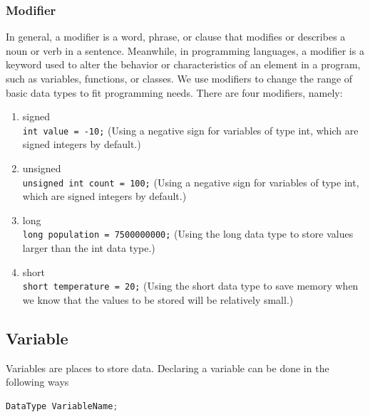 \subsubsection{Modifier}
In general, a modifier is a word, phrase, or clause that modifies or describes a noun or verb in a sentence. Meanwhile, in programming languages, a modifier is a keyword used to alter the behavior or characteristics of an element in a program, such as variables, functions, or classes. We use modifiers to change the range of basic data types to fit programming needs. There are four modifiers, namely:
\begin{enumerate}
	\item signed \\
	      \verb|int value = -10;| (Using a negative sign for variables of type int, which are signed integers by default.)
	\item unsigned \\
	      \verb|unsigned int count = 100;|  (Using a negative sign for variables of type int, which are signed integers by default.)
	\item long \\
	      \verb|long population = 7500000000;| (Using the long data type to store values larger than the int data type.)
	\item short \\
	      \verb|short temperature = 20;| (Using the short data type to save memory when we know that the values to be stored will be relatively small.)
\end{enumerate}


\subsection{Variable}
Variables are places to store data. Declaring a variable can be done in the following ways
\begin{lstlisting}[language=c,caption=C variable declaration,label=lst:deklarasivariabel,captionpos=t]
DataType VariableName;
\end{lstlisting}
